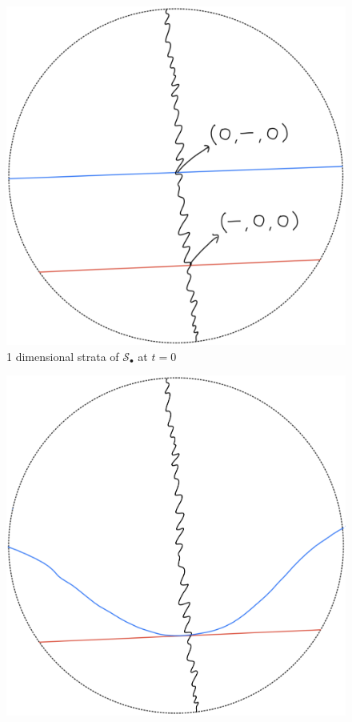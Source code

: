 \begin{definition}
\begin{enumerate}
\begin{itemize}
\begin{figure}[H]
    \centering
    \includegraphics[scale = 0.95]{diagrams/lemma1/13.png} 
    \caption{1 dimensional strata of $\mathcal{S}_\bullet$ at $t=0$}
    \label{fig:your-label}
\end{figure}
\begin{figure}[H]
    \centering
    \includegraphics[scale = 0.95]{diagrams/lemma1/14.png} 

\end{figure}
\end{itemize}
\end{enumerate}
\end{definition}
